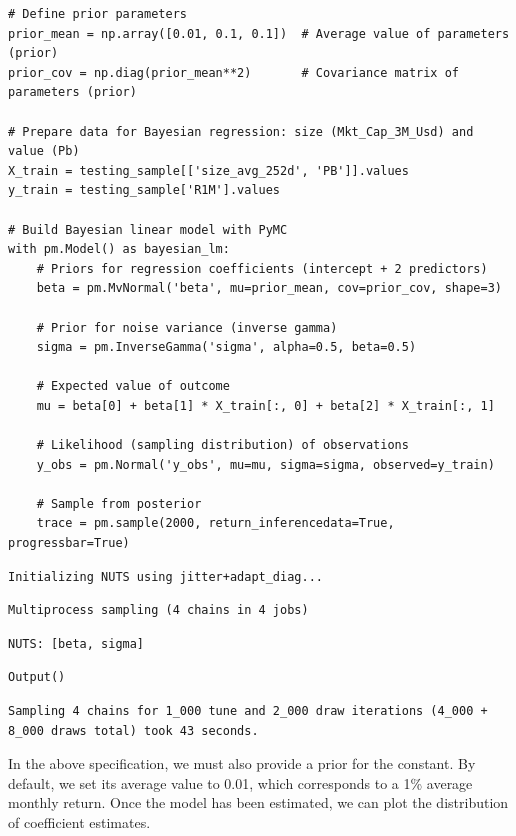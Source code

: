 \begin{verbatim}
# Define prior parameters
prior_mean = np.array([0.01, 0.1, 0.1])  # Average value of parameters (prior)
prior_cov = np.diag(prior_mean**2)       # Covariance matrix of parameters (prior)

# Prepare data for Bayesian regression: size (Mkt_Cap_3M_Usd) and value (Pb)
X_train = testing_sample[['size_avg_252d', 'PB']].values
y_train = testing_sample['R1M'].values

# Build Bayesian linear model with PyMC
with pm.Model() as bayesian_lm:
    # Priors for regression coefficients (intercept + 2 predictors)
    beta = pm.MvNormal('beta', mu=prior_mean, cov=prior_cov, shape=3)
    
    # Prior for noise variance (inverse gamma)
    sigma = pm.InverseGamma('sigma', alpha=0.5, beta=0.5)
    
    # Expected value of outcome
    mu = beta[0] + beta[1] * X_train[:, 0] + beta[2] * X_train[:, 1]
    
    # Likelihood (sampling distribution) of observations
    y_obs = pm.Normal('y_obs', mu=mu, sigma=sigma, observed=y_train)
    
    # Sample from posterior
    trace = pm.sample(2000, return_inferencedata=True, progressbar=True)
\end{verbatim}

\begin{verbatim}
Initializing NUTS using jitter+adapt_diag...
\end{verbatim}

\begin{verbatim}
Multiprocess sampling (4 chains in 4 jobs)
\end{verbatim}

\begin{verbatim}
NUTS: [beta, sigma]
\end{verbatim}

\begin{verbatim}
Output()
\end{verbatim}

\begin{verbatim}
Sampling 4 chains for 1_000 tune and 2_000 draw iterations (4_000 + 8_000 draws total) took 43 seconds.
\end{verbatim}

In the above specification, we must also provide a prior for the constant. By default, we set its average value to 0.01, which corresponds to a 1\% average monthly return. Once the model has been estimated, we can plot the distribution of coefficient estimates.

